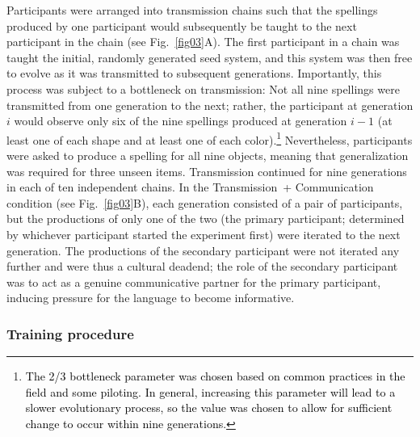 \documentclass[doc,biblatex]{apa7}
\newcommand\newmaterial[1]{\textcolor{black}{#1}}
\begin{document}
Participants were arranged into transmission chains such that the spellings produced by one participant would subsequently be taught to the next participant in the chain (see Fig.~\ref{fig03}A). The first participant in a chain was taught the initial, randomly generated seed system, and this system was then free to evolve as it was transmitted to subsequent generations. Importantly, this process was subject to a bottleneck on transmission: Not all nine spellings were transmitted from one generation to the next; rather, the participant at generation $i$ would observe only six of the nine spellings produced at generation $i-1$ (at least one of each shape and at least one of each color).\footnote{\newmaterial{The 2/3 bottleneck parameter was chosen based on common practices in the field and some piloting. In general, increasing this parameter will lead to a slower evolutionary process, so the value was chosen to allow for sufficient change to occur within nine generations.}} Nevertheless, participants were asked to produce a spelling for all nine objects, meaning that generalization was required for three unseen items. Transmission continued for nine generations in each of ten independent chains. In the Transmission~+ Communication condition (see Fig.~\ref{fig03}B), each generation consisted of a pair of participants, but the productions of only one of the two (the primary participant; determined by whichever participant started the experiment first) were iterated to the next generation. The productions of the secondary participant were not iterated any further and were thus a cultural deadend; the role of the secondary participant was to act as a genuine communicative partner for the primary participant, inducing pressure for the language to become informative.

\subsubsection{Training procedure}
\end{document}
